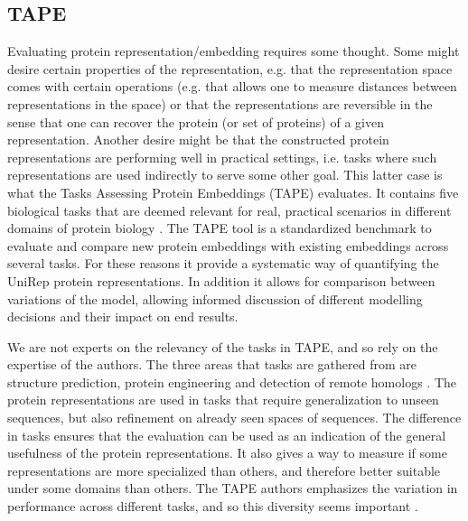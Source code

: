 \documentclass[a4paper,12pt]{article}
\begin{document}
\subsection{TAPE}
Evaluating protein representation/embedding requires some thought. Some might desire certain properties of the representation, e.g. that the representation space comes with certain operations (e.g. that allows one to measure distances between representations in the space) or that the representations are reversible in the sense that one can recover the protein (or set of proteins) of a given representation. Another desire might be that the constructed protein representations are performing well in practical settings, i.e. tasks where such representations are used indirectly to serve some other goal. This latter case is what the Tasks Assessing Protein Embeddings (TAPE) evaluates. It contains five biological tasks that are deemed relevant for real, practical scenarios in different domains of protein biology \cite{tape2019}. The TAPE tool is a standardized benchmark to evaluate and compare new protein embeddings with existing embeddings across several tasks. For these reasons it provide a systematic way of quantifying the UniRep protein representations. In addition it allows for comparison between variations of the model, allowing informed discussion of different modelling decisions and their impact on end results.

We are not experts on the relevancy of the tasks in TAPE, and so rely on the expertise of the authors. The three areas that tasks are gathered from are structure prediction, protein engineering and detection of remote homologs \cite{tape2019}. The protein representations are used in tasks that require generalization to unseen sequences, but also refinement on already seen spaces of sequences. The difference in tasks ensures that the evaluation can be used as an indication of the general usefulness of the protein representations. It also gives a way to measure if some representations are more specialized than others, and therefore better suitable under some domains than others. The TAPE authors emphasizes the variation in performance across different tasks, and so this diversity seems important \cite{tape2019}.
\end{document}
